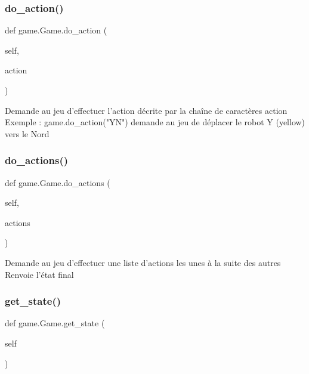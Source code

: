 \subsubsection{\texorpdfstring{do\+\_\+action()}{do\_action()}}
{\footnotesize\ttfamily def game.\+Game.\+do\+\_\+action (\begin{DoxyParamCaption}\item[{}]{self,  }\item[{}]{action }\end{DoxyParamCaption})}

\begin{DoxyVerb}Demande au jeu d'effectuer l'action décrite par la chaîne de caractères action
Exemple :
    game.do_action("YN") demande au jeu de déplacer le robot Y (yellow) vers le Nord
\end{DoxyVerb}
 \mbox{\label{classgame_1_1Game_a62f9d3a23be4b342ee35e56cdaf073a3}} 
\subsubsection{\texorpdfstring{do\+\_\+actions()}{do\_actions()}}
{\footnotesize\ttfamily def game.\+Game.\+do\+\_\+actions (\begin{DoxyParamCaption}\item[{}]{self,  }\item[{}]{actions }\end{DoxyParamCaption})}

\begin{DoxyVerb}Demande au jeu d'effectuer une liste d'actions les unes à la suite des autres
Renvoie l'état final
\end{DoxyVerb}
 \mbox{\label{classgame_1_1Game_aaa2b3e9d8578764bc3eda7ab5841ecbb}} 
\subsubsection{\texorpdfstring{get\+\_\+state()}{get\_state()}}
{\footnotesize\ttfamily def game.\+Game.\+get\+\_\+state (\begin{DoxyParamCaption}\item[{}]{self }\end{DoxyParamCaption})}

